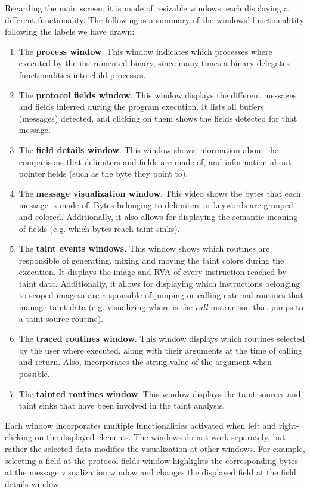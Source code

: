\documentclass[conference]{IEEEtran}
\begin{document}
Regarding the main screen, it is made of resizable windows, each displaying a different functionality.
The following is a summary of the windows' functionalitity following the labels we have drawn:
\begin{enumerate}
    \item The \textbf{process window}. This window indicates which processes where executed by the instrumented
    binary, since many times a binary delegates functionalities into child processes. 
    \item The \textbf{protocol fields window}. This window displays the different messages and fields 
    inferred during the program execution. It lists all buffers (messages) detected, and clicking
    on them shows the fields detected for that message.
    \item The \textbf{field details window}. This window shows information about the comparisons that delimiters
    and fields are made of, and information about pointer fields (such as the byte they point to).
    \item The \textbf{message visualization window}. This video shows the bytes that each message is made of.
    Bytes belonging to delimiters or keywords are grouped and colored. Additionally, it also allows
    for displaying the semantic meaning of fields (e.g. which bytes reach taint sinks).
    \item The \textbf{taint events windows}. This window shows which routines are responsible of generating,
    mixing and moving the taint colors during the execution. It displays the image and RVA of every instruction
    reached by taint data. Additionally, it allows for displaying which instructions belonging to scoped imagesa
    are responsible of jumping or calling external routines that manage taint data (e.g. visualizing where is the
    \textit{call} instruction that jumps to a taint source routine).
    \item The \textbf{traced routines window}. This window displays which routines selected by the user
    where executed, along with their arguments at the time of calling and return. Also, incorporates the string
    value of the argument when possible.
    \item The \textbf{tainted routines window}. This window displays the taint sources and taint sinks
    that have been involved in the taint analysis.
\end{enumerate}

Each window incorporates multiple functionalities activated when left and right-clicking on the
displayed elements. The windows do not work separately, but rather the selected data modifies
the visualization at other windows. For example, selecting a field at the protocol fields window 
highlights the corresponding bytes at the message visualization window and changes the displayed
field at the field details window. 
\end{document}
